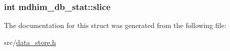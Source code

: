 \hypertarget{structmdhim__db__stat_af69e251abcde91c5441f7a55c408ab55}{
\subsubsection[{slice}]{\setlength{\rightskip}{0pt plus 5cm}int mdhim\-\_\-db\-\_\-stat\-::slice}}\label{db/d64/structmdhim__db__stat_af69e251abcde91c5441f7a55c408ab55}


The documentation for this struct was generated from the following file\-:\begin{DoxyCompactItemize}
\item 
src/\hyperlink{data__store_8h}{data\-\_\-store.\-h}\end{DoxyCompactItemize}
